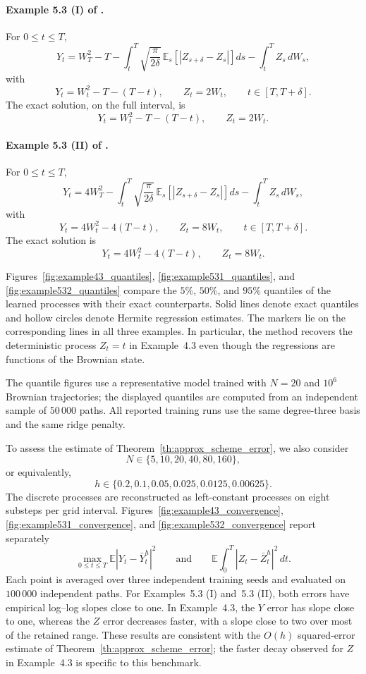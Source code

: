 \paragraph{Example 5.3 (I) of \citet{peng2009anticipated}.}
For $0\leq t\leq T$,
\[
Y_t
=
W_T^2-T
-
\int_t^T
\sqrt{\frac{\pi}{2\delta}}\,
\mathbb E_s\!\left[|Z_{s+\delta}-Z_s|\right]ds
-
\int_t^T Z_s\,dW_s,
\]
with
\[
Y_t=W_t^2-T-(T-t),
\qquad
Z_t=2W_t,
\qquad t\in[T,T+\delta].
\]
The exact solution, on the full interval, is
\[
Y_t=W_t^2-T-(T-t),
\qquad
Z_t=2W_t.
\]

\paragraph{Example 5.3 (II) of \citet{peng2009anticipated}.}
For $0\leq t\leq T$,
\[
Y_t
=
4W_T^2
-
\int_t^T
\sqrt{\frac{\pi}{2\delta}}\,
\mathbb E_s\!\left[|Z_{s+\delta}-Z_s|\right]ds
-
\int_t^T Z_s\,dW_s,
\]
with
\[
Y_t=4W_t^2-4(T-t),
\qquad
Z_t=8W_t,
\qquad t\in[T,T+\delta].
\]
The exact solution is
\[
Y_t=4W_t^2-4(T-t),
\qquad
Z_t=8W_t.
\]

Figures~\ref{fig:example43_quantiles}, \ref{fig:example531_quantiles}, and
\ref{fig:example532_quantiles} compare the $5\%$, $50\%$, and $95\%$ quantiles
of the learned processes with their exact counterparts. Solid lines denote exact
quantiles and hollow circles denote Hermite regression estimates. The markers lie
on the corresponding lines in all three examples. In particular, the method
recovers the deterministic process $Z_t=t$ in Example~4.3 even though the
regressions are functions of the Brownian state.

The quantile figures use a representative model trained with $N=20$ and
$10^6$ Brownian trajectories; the displayed quantiles are computed from an
independent sample of $50\,000$ paths. All reported training runs use the same
degree-three basis and the same ridge penalty.

To assess the estimate of Theorem~\ref{th:approx_scheme_error}, we also consider
\[
N\in\{5,10,20,40,80,160\},
\]
or equivalently,
\[
h\in\{0.2,0.1,0.05,0.025,0.0125,0.00625\}.
\]
The discrete processes are reconstructed as left-constant processes on eight
substeps per grid interval. Figures~\ref{fig:example43_convergence},
\ref{fig:example531_convergence}, and \ref{fig:example532_convergence} report
separately
\[
\max_{0\leq t\leq T}\mathbb E|Y_t-\bar Y_t^h|^2
\qquad\text{and}\qquad
\mathbb E\!\int_0^T |Z_t-\bar Z_t^h|^2\,dt.
\]
Each point is averaged over three independent training seeds and evaluated on
$100\,000$ independent paths. For Examples~5.3 (I) and~5.3 (II), both errors
have empirical log--log slopes close to one. In Example~4.3, the $Y$ error has
slope close to one, whereas the $Z$ error decreases faster, with a slope close
to two over most of the retained range. These results are consistent with the
$O(h)$ squared-error estimate of Theorem~\ref{th:approx_scheme_error}; the faster
decay observed for $Z$ in Example~4.3 is specific to this benchmark.

